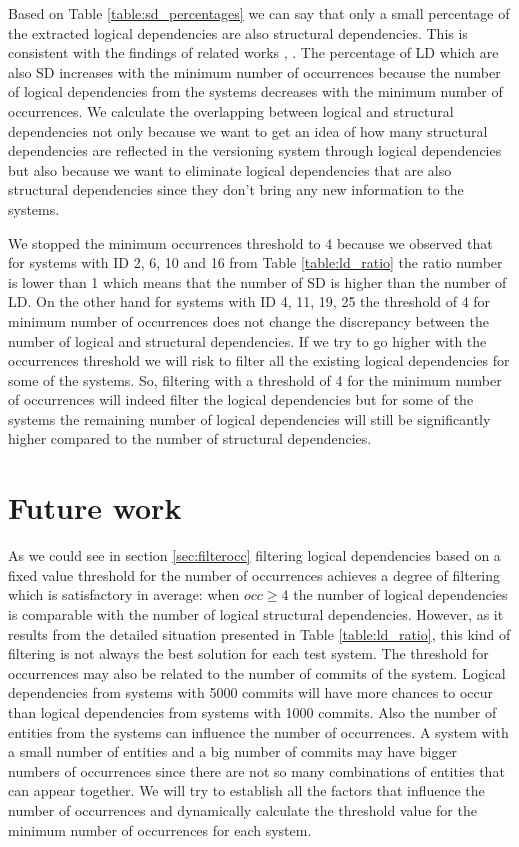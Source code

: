 \documentclass[conference]{IEEEtran}
\begin{document}
Based on Table \ref{table:sd_percentages} we can say that only a small percentage of the extracted logical dependencies are also structural dependencies. This is consistent with the findings of related works \cite{DBLP:journals/jss/AjienkaC17}, \cite{DBLP:journals/ese/AjienkaCC18}. The percentage of LD which are also SD  increases with the minimum number of occurrences because the number of logical dependencies from the systems decreases with the minimum number of occurrences. 
We calculate the overlapping between logical and structural dependencies not only because we want to get an idea of how many structural dependencies are reflected in the versioning system through logical dependencies but also because we want to eliminate logical dependencies that are also structural dependencies since they don't bring any new information to the systems.

We stopped the minimum occurrences threshold to 4 because we observed that for systems with ID 2, 6, 10 and 16 from Table \ref{table:ld_ratio} the ratio number is lower than 1 which means that the number of SD is higher than the number of LD. On the other hand for systems with ID 4, 11, 19, 25 the threshold of 4 for minimum number of occurrences does not change the discrepancy between the number of logical and structural dependencies.
If we try to go higher with the occurrences threshold we will risk to filter all the existing logical dependencies for some of the systems.
So, filtering with a threshold of 4 for the minimum number of occurrences will indeed filter the logical dependencies but for some of the systems the remaining number of logical dependencies will still be significantly higher compared to the number of structural dependencies.



\section{Future work}
\label{sec:future}
As we could see in section \ref{sec:filterocc} filtering logical dependencies based on a fixed value threshold for the number of occurrences achieves a degree of filtering which is satisfactory in average: when $occ\geq 4$ the number of logical dependencies is comparable with the number of logical structural dependencies. However, as it results from the detailed situation presented in Table \ref{table:ld_ratio}, this kind of filtering is not always the best solution for each test system.
The threshold for occurrences may also be related to the number of commits of the system. Logical dependencies from systems with 5000 commits will have more chances to occur than logical dependencies from systems with 1000 commits. Also the number of entities from the systems can influence the number of occurrences. A system with a small number of entities and a big number of commits may have bigger numbers of occurrences since there are not so many combinations of entities that can appear together.
We will try to establish all the factors that influence the number of occurrences and dynamically calculate the threshold value for the minimum number of occurrences for each system.
\end{document}
